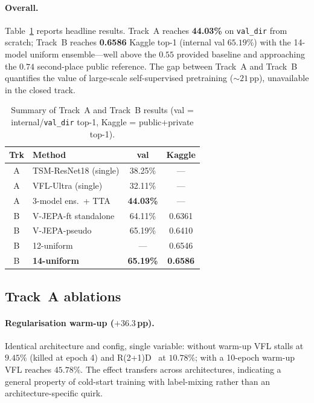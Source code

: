 \documentclass[10pt,twocolumn,letterpaper]{article}
\begin{document}
\paragraph{Overall.}
Table~\ref{tab:summary} reports headline results. Track~A reaches \textbf{44.03\%}
on \texttt{val\_dir} from scratch; Track~B reaches \textbf{0.6586} Kaggle top-1
(internal val $65.19\%$) with the 14-model uniform ensemble---well above the
$0.55$ provided baseline and approaching the $0.74$ second-place public
reference. The gap between Track~A and Track~B quantifies the value of
large-scale self-supervised pretraining (${\sim}21$\,pp), unavailable in the
closed track.

\begin{table}[t]
\centering\small
\setlength{\tabcolsep}{6pt}
\begin{tabular}{@{}clcc@{}}
\toprule
Trk & Method & val & Kaggle \\
\midrule
A & TSM-ResNet18 (single)      & 38.25\% & --- \\
A & VFL-Ultra (single)         & 32.11\% & --- \\
A & 3-model ens.\ + TTA        & \textbf{44.03\%} & --- \\
\midrule
B & V-JEPA-ft standalone       & 64.11\% & 0.6361 \\
B & V-JEPA-pseudo              & 65.19\% & 0.6410 \\
B & 12-uniform                 & ---     & 0.6546 \\
B & \textbf{14-uniform}        & \textbf{65.19\%} & \textbf{0.6586} \\
\bottomrule
\end{tabular}
\caption{Summary of Track~A and Track~B results (val = internal/\texttt{val\_dir}
top-1, Kaggle = public+private top-1).}
\label{tab:summary}
\end{table}

\subsection{Track~A ablations}
\paragraph{Regularisation warm-up ($+36.3$\,pp).}
Identical architecture and config, single variable: without warm-up VFL stalls
at $9.45\%$ (killed at epoch 4) and R(2+1)D~\cite{tran2018r2plus1d} at $10.78\%$;
with a 10-epoch warm-up VFL reaches $45.78\%$. The effect transfers across
architectures, indicating a general property of cold-start training with
label-mixing rather than an architecture-specific quirk.
\end{document}
